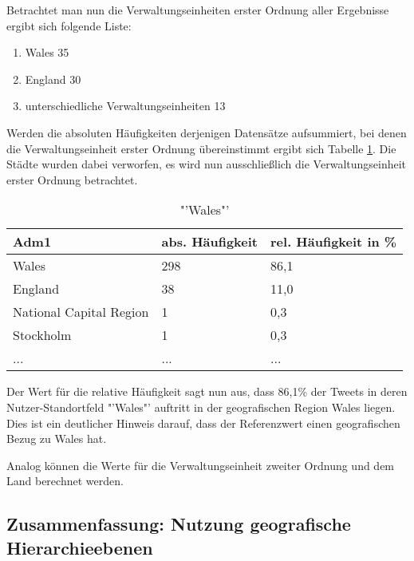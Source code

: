 			Betrachtet man nun die Verwaltungseinheiten erster Ordnung aller Ergebnisse ergibt sich folgende Liste:

			\begin{enumerate}
				\item Wales 35
				\item England 30
				\item unterschiedliche Verwaltungseinheiten 13
			\end{enumerate}

			Werden die absoluten Häufigkeiten derjenigen Datensätze aufsummiert, bei denen die Verwaltungseinheit erster Ordnung übereinstimmt ergibt sich Tabelle \ref{tab:WalesVerw1}.
			Die Städte wurden dabei verworfen, es wird nun ausschließlich die Verwaltungseinheit erster Ordnung betrachtet.
			
			\begin{table}[h]
			\centering
			\caption{"'Wales"'}
			\label{tab:WalesVerw1}
			\begin{tabular}{|l|l|l|}
			\hline
			Adm1 & abs. Häufigkeit & rel. Häufigkeit in \% \\ \hline \hline
			Wales                   & 298 & 86,1 \\ \hline
			England                 & 38  & 11,0 \\ \hline
			National Capital Region & 1   & 0,3  \\ \hline
			Stockholm               & 1   & 0,3  \\ \hline
			... & ... & ... \\ \hline
			\end{tabular}
			\end{table}  

			Der Wert für die relative Häufigkeit sagt nun aus, dass 86,1\% der Tweets in deren Nutzer-Standortfeld "'Wales"' auftritt in der geografischen Region Wales liegen.
			Dies ist ein deutlicher Hinweis darauf, dass der Referenzwert einen geografischen Bezug zu Wales hat.

			Analog können die Werte für die Verwaltungseinheit zweiter Ordnung und dem Land berechnet werden.

		\subsection{Zusammenfassung: Nutzung geografische Hierarchieebenen}

